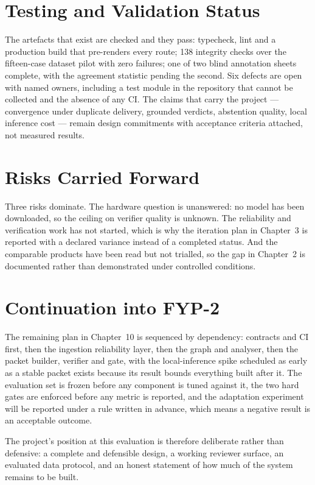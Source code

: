 \section{Testing and Validation Status}

The artefacts that exist are checked and they pass: typecheck, lint and a
production build that pre-renders every route; 138 integrity checks over the
fifteen-case dataset pilot with zero failures; one of two blind annotation
sheets complete, with the agreement statistic pending the second. Six defects
are open with named owners, including a test module in the repository that
cannot be collected and the absence of any CI. The claims that carry the
project --- convergence under duplicate delivery, grounded verdicts, abstention
quality, local inference cost --- remain design commitments with acceptance
criteria attached, not measured results.

\section{Risks Carried Forward}

Three risks dominate. The hardware question is unanswered: no model has been
downloaded, so the ceiling on verifier quality is unknown. The reliability and
verification work has not started, which is why the iteration plan in
Chapter~3 is reported with a declared variance instead of a completed status.
And the comparable products have been read but not trialled, so the gap in
Chapter~2 is documented rather than demonstrated under controlled conditions.

\section{Continuation into FYP-2}

The remaining plan in Chapter~10 is sequenced by dependency: contracts and CI
first, then the ingestion reliability layer, then the graph and analyser, then
the packet builder, verifier and gate, with the local-inference spike scheduled
as early as a stable packet exists because its result bounds everything built
after it. The evaluation set is frozen before any component is tuned against it,
the two hard gates are enforced before any metric is reported, and the
adaptation experiment will be reported under a rule written in advance, which
means a negative result is an acceptable outcome.

The project's position at this evaluation is therefore deliberate rather than
defensive: a complete and defensible design, a working reviewer surface, an
evaluated data protocol, and an honest statement of how much of the system
remains to be built.
